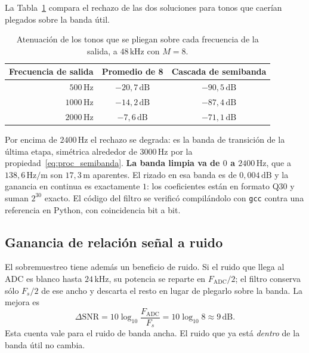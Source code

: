 La Tabla~\ref{tab:proc_rechazo} compara el rechazo de las dos soluciones
para tonos que caerían plegados sobre la banda útil.

\begin{table}[H]
  \centering
  \caption{Atenuación de los tonos que se pliegan sobre cada frecuencia de
  la salida, a $48\,\text{kHz}$ con $M = 8$.}
  \label{tab:proc_rechazo}
  \begin{tabular}{rcc}
    \toprule
    \textbf{Frecuencia de salida} & \textbf{Promedio de 8} &
      \textbf{Cascada de semibanda} \\
    \midrule
    $500\,\text{Hz}$  & $-20{,}7\,\text{dB}$ & $-90{,}5\,\text{dB}$ \\
    $1000\,\text{Hz}$ & $-14{,}2\,\text{dB}$ & $-87{,}4\,\text{dB}$ \\
    $2000\,\text{Hz}$ & $-7{,}6\,\text{dB}$  & $-71{,}1\,\text{dB}$ \\
    \bottomrule
  \end{tabular}
\end{table}

Por encima de $2400\,\text{Hz}$ el rechazo se degrada: es la banda de
transición de la última etapa, simétrica alrededor de $3000\,\text{Hz}$ por
la propiedad~\eqref{eq:proc_semibanda}. \textbf{La banda limpia va de $0$ a
$2400\,\text{Hz}$}, que a $138{,}6\,\text{Hz/m}$ son $17{,}3\,\text{m}$
aparentes. El rizado en esa banda es de $0{,}004\,\text{dB}$ y la ganancia en
continua es exactamente $1$: los coeficientes están en formato Q30 y suman
$2^{30}$ exacto. El código del filtro se verificó compilándolo con
\texttt{gcc} contra una referencia en Python, con coincidencia bit a bit.

\subsection{Ganancia de relación señal a ruido}

El sobremuestreo tiene además un beneficio de ruido. Si el ruido que llega al
ADC es blanco hasta $24\,\text{kHz}$, su potencia se reparte en $F_\text{ADC}/2$;
el filtro conserva sólo $F_s/2$ de ese ancho y descarta el resto en lugar de
plegarlo sobre la banda. La mejora es
\begin{equation}
  \Delta\text{SNR} = 10\log_{10}\frac{F_\text{ADC}}{F_s}
  = 10\log_{10} 8 \approx 9\,\text{dB}.
\end{equation}
Esta cuenta vale para el ruido de banda ancha. El ruido que ya está
\emph{dentro} de la banda útil no cambia.

